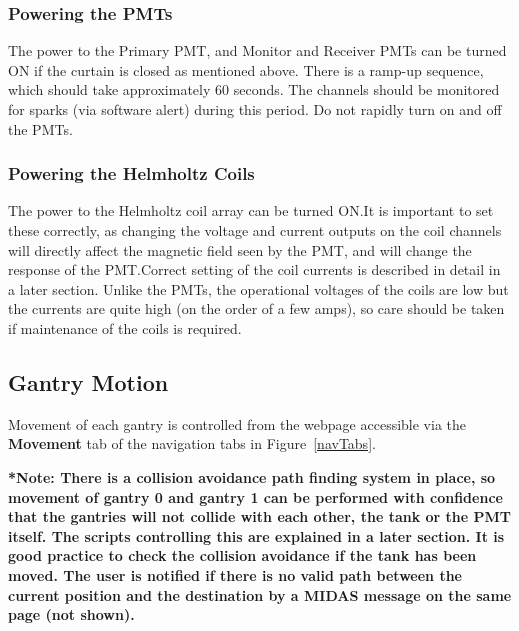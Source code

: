 \documentclass[twoside,letterpaper]{refart}
\begin{document}
\subsubsection{Powering the PMTs}

The power to the Primary PMT, and Monitor and Receiver PMTs can be turned ON if the curtain is closed as mentioned above. There is a ramp-up sequence, which should take approximately 60 seconds. The channels should be monitored for sparks (via software alert) during this period. Do not rapidly turn on and off the PMTs.

\subsubsection{Powering the Helmholtz Coils}

The power to the Helmholtz coil array can be turned ON.\@ It is important to set these correctly, as changing the voltage and current outputs on the coil channels will directly affect the magnetic field seen by the PMT, and will change the response of the PMT.\@ Correct setting of the coil currents is described in detail in a later section. Unlike the PMTs, the operational voltages of the coils are low but the currents are quite high (on the order of a few amps), so care should be taken if maintenance of the coils is required.

\subsection{Gantry Motion}

Movement of each gantry is controlled from the webpage accessible via the \textbf{Movement} tab of the navigation tabs in Figure~\ref{navTabs}.

\textbf{*Note: There is a collision avoidance path finding system in place, so movement of gantry 0 and gantry 1 can be performed with confidence that the gantries will not collide with each other, the tank or the PMT itself. The scripts controlling this are explained in a later section. It is good practice to check the collision avoidance if the tank has been moved. The user is notified if there is no valid path between the current position and the destination by a MIDAS message on the same page (not shown).}

\FloatBarrier
\end{document}
